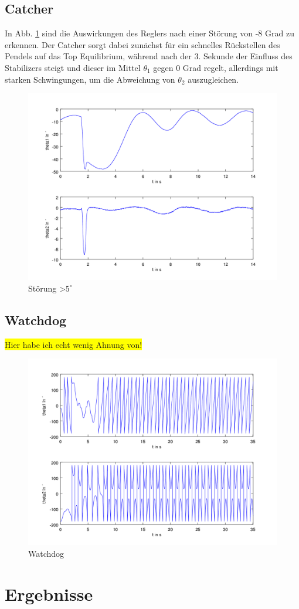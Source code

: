 \subsection{Catcher}
In Abb. \ref{fig.Catcher-Plot} sind die Auswirkungen des Reglers nach einer Störung von -8 Grad zu erkennen. Der Catcher sorgt dabei zunächst für ein schnelles Rückstellen des Pendels auf das Top Equilibrium, während nach der 3. Sekunde der Einfluss des Stabilizers steigt und dieser im Mittel $\theta_1$ gegen 0 Grad regelt, allerdings mit starken Schwingungen, um die Abweichung von $\theta_2$ auszugleichen. 
\begin{figure}[htbp]
	\label{fig.Catcher-Plot}
	\centering
	\includegraphics[width=1.\textwidth]{Grafiken/Catch_kurz.png}
	\caption{Störung \textgreater $5^{\circ}$}
\end{figure}

\subsection{Watchdog}
\colorbox{yellow}{Hier habe ich echt wenig Ahnung von!}
\begin{figure}[htbp]
	\label{fig.Watchdog-Plot}
	\centering
	\includegraphics[width=1.\textwidth]{Grafiken/Watchdog_lang.png}
	\caption{Watchdog}
\end{figure}\section{Ergebnisse}